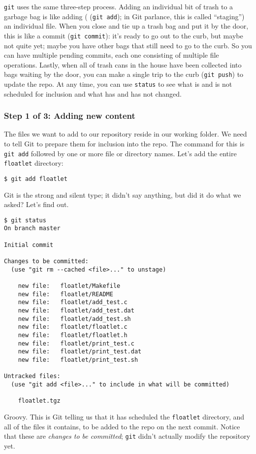 \documentclass[12pt]{article}
\begin{document}
\verb|git| uses the same three-step process.  Adding an individual bit of trash to a garbage bag is like adding ( (\verb|git add|); in Git parlance, this is called ``staging'') an individual file.  When you close and tie up a trash bag and put it by the door, this is like a commit (\verb|git commit|): it's ready to go out to the curb, but maybe not quite yet; maybe you have other bags that still need to go to the curb.  So you can have multiple pending commits, each one consisting of multiple file operations.  Lastly, when all of trash cans in the house have been collected into bags waiting by the door, you can make a single trip to the curb (\verb|git push|) to update the repo.  At any time, you can use \verb|status| to see what is and is not scheduled for inclusion and what has and has not changed.

\subsubsection{Step 1 of 3: Adding new content}
The files we want to add to our repository reside in our working folder.  We need to tell Git to prepare them for inclusion into the repo.  The command for this is \verb|git add| followed by one or more file or directory names.  Let's add the entire \verb|floatlet| directory:
\begin{verbatim}
$ git add floatlet
\end{verbatim}
Git is the strong and silent type; it didn't say anything, but did it do what we asked?  Let's find out.
\begin{verbatim}
$ git status
On branch master

Initial commit

Changes to be committed:
  (use "git rm --cached <file>..." to unstage)

	new file:   floatlet/Makefile
	new file:   floatlet/README
	new file:   floatlet/add_test.c
	new file:   floatlet/add_test.dat
	new file:   floatlet/add_test.sh
	new file:   floatlet/floatlet.c
	new file:   floatlet/floatlet.h
	new file:   floatlet/print_test.c
	new file:   floatlet/print_test.dat
	new file:   floatlet/print_test.sh

Untracked files:
  (use "git add <file>..." to include in what will be committed)

	floatlet.tgz
\end{verbatim}
Groovy.  This is Git telling us that it has scheduled the \verb|floatlet| directory, and all of the files it contains, to be added to the repo on the next commit.  Notice that these are \textit{changes to be committed}; \verb|git| didn't actually modify the repository yet.
\end{document}
